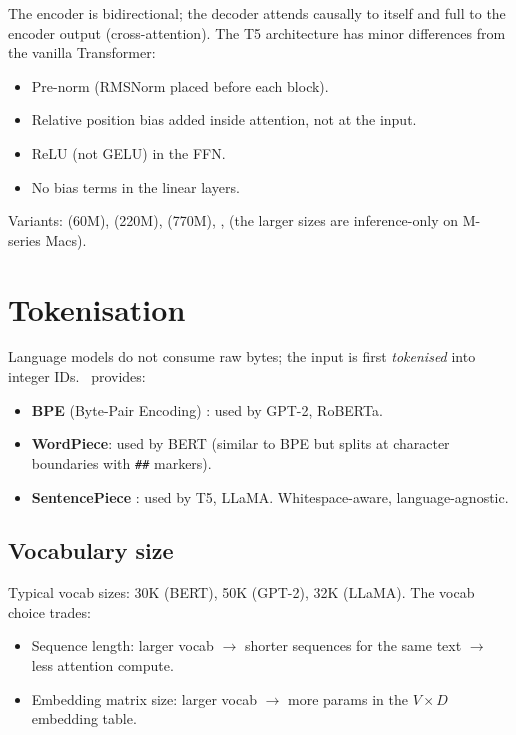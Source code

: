 The encoder is bidirectional; the decoder attends causally to
itself and full to the encoder output (cross-attention). The
T5 architecture has minor differences from the vanilla
Transformer:
\begin{itemize}
  \item Pre-norm (RMSNorm placed before each block).
  \item Relative position bias added inside attention, not at
    the input.
  \item ReLU (not GELU) in the FFN.
  \item No bias terms in the linear layers.
\end{itemize}

Variants:  (60M),  (220M),
 (770M), , 
(the larger sizes are inference-only on M-series Macs).

\section{Tokenisation}
\label{sec:language_models:tokenisation}

Language models do not consume raw bytes; the input is first
\emph{tokenised} into integer IDs. \Lucid\ provides:

\begin{itemize}
  \item \textbf{BPE} (Byte-Pair Encoding) \cite{sennrich_bpe_2016}:
    used by GPT-2, RoBERTa.
  \item \textbf{WordPiece}: used by BERT (similar to BPE but
    splits at character boundaries with \texttt{\#\#} markers).
  \item \textbf{SentencePiece} \cite{kudo_sentencepiece_2018}:
    used by T5, LLaMA. Whitespace-aware, language-agnostic.
\end{itemize}

\subsection{Vocabulary size}
\label{ssec:language_models:vocab_size}

Typical vocab sizes: 30K (BERT), 50K (GPT-2), 32K (LLaMA).
The vocab choice trades:
\begin{itemize}
  \item Sequence length: larger vocab $\to$ shorter sequences
    for the same text $\to$ less attention compute.
  \item Embedding matrix size: larger vocab $\to$ more params
    in the $V \times D$ embedding table.
\end{itemize}

